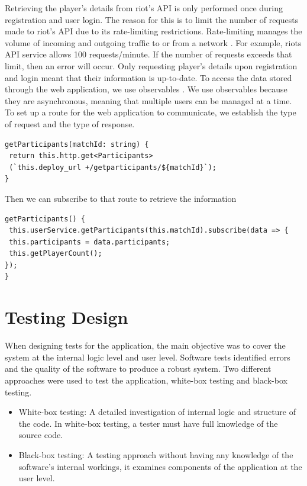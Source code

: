 Retrieving the player's details from riot's API is only performed once during registration and user login. The reason for this is to limit the number of requests made to riot's API due to its rate-limiting restrictions. Rate-limiting manages the volume of incoming and outgoing traffic to or from a network \cite{raghavan2007cloud}. For example, riots API service allows 100 requests/minute. If the number of requests exceeds that limit, then an error will occur. Only requesting player's details upon registration and login meant that their information is up-to-date.\hfill \break
To access the data stored through the web application, we use observables \cite{rxjs}. We use observables because they are asynchronous, meaning that multiple users can be managed at a time.\hfill \break
To set up a route for the web application to communicate, we establish the type of request and the type of response.
\begin{verbatim}
getParticipants(matchId: string) {
 return this.http.get<Participants>
 (`this.deploy_url +/getparticipants/${matchId}`);
}
\end{verbatim}


Then we can subscribe to that route to retrieve the information
\begin{verbatim}
getParticipants() {
 this.userService.getParticipants(this.matchId).subscribe(data => {
 this.participants = data.participants;
 this.getPlayerCount();
});
}
\end{verbatim}

\newpage
\section{Testing Design}
When designing tests for the application, the main objective was to cover the system at the internal logic level and user level. Software tests identified errors and the quality of the software \cite{nidhra2012black} to produce a robust system. Two different approaches were used to test the application, white-box testing and black-box testing. 
\begin{itemize}
	\item White-box testing: A detailed investigation of internal logic and structure of the code. In white-box testing, a tester must have full knowledge of the source code.
	\item Black-box testing: A testing approach without having any knowledge of the software's internal workings, it examines components of the application at the user level.
\end{itemize}

